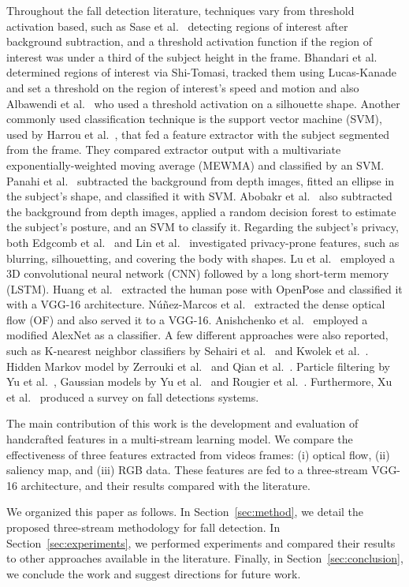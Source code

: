 \documentclass[conference]{IEEEtran}
\begin{document}
Throughout the fall detection literature, techniques vary from threshold activation based, such as Sase et al.~\cite{sase2018human} detecting regions of interest after background subtraction, and a threshold activation function if the region of interest was under a third of the subject height in the frame. Bhandari et al.~\cite{bhandari2017novel} determined regions of interest via Shi-Tomasi, tracked them using Lucas-Kanade and set a threshold on the region of interest's speed and motion and also Albawendi et al.~\cite{albawendi2018video} who used a threshold activation on a silhouette shape. Another commonly used classification technique is the support vector machine (SVM), used by Harrou et al.~\cite{harrou2017vision}, that fed a feature extractor with the subject segmented from the frame. They compared extractor output with a multivariate exponentially-weighted moving average (MEWMA) and classified by an SVM. Panahi et al.~\cite{panahi2018human} subtracted the background from depth images, fitted an ellipse in the subject's shape, and classified it with SVM. Abobakr et al.~\cite{abobakr2017skeleton} also subtracted the background from depth images, applied a random decision forest to estimate the subject's posture, and an SVM to classify it. Regarding the subject's privacy, both Edgcomb et al.~\cite{edgcomb2012automated} and Lin et al.~\cite{lin2013fall} investigated privacy-prone features, such as blurring, silhouetting, and covering the body with shapes. Lu et al.~\cite{lu2018deep} employed a 3D convolutional neural network (CNN) followed by a long short-term memory (LSTM). Huang et al.~\cite{huang2018video} extracted the human pose with OpenPose and classified it with a VGG-16 architecture. N\'u\~nez-Marcos et al.~\cite{nunez2017vision} extracted the dense optical flow (OF) and also served it to a VGG-16. Anishchenko et al.~\cite{anishchenko2018machine} employed a modified AlexNet as a classifier. A few different approaches were also reported, such as K-nearest neighbor classifiers by Sehairi et al.~\cite{sehairi2018elderly} and Kwolek et al.~\cite{kwolek2015improving}. Hidden Markov model by Zerrouki et al.~\cite{zerrouki2018combined} and Qian et al.~\cite{qian2017recognizing}. Particle filtering by Yu et al.~\cite{yu2009fall}, Gaussian models by Yu et al.~\cite{yu2010robust} and Rougier et al.~\cite{rougier2011robust}. Furthermore, Xu et al.~\cite{xu2018new} produced a survey on fall detections systems.\par
The main contribution of this work is the development and evaluation of handcrafted features in a multi-stream learning model. We compare the effectiveness of three features extracted from videos frames: (i) optical flow, (ii) saliency map, and (iii) RGB data. These features are fed to a three-stream VGG-16 architecture, and their results compared with the literature.\par
We organized this paper as follows. In Section~\ref{sec:method}, we detail the proposed three-stream methodology for fall detection. In Section~\ref{sec:experiments}, we performed experiments and compared their results to other approaches available in the literature. Finally, in Section~\ref{sec:conclusion}, we conclude the work and suggest directions for future work.
\end{document}
